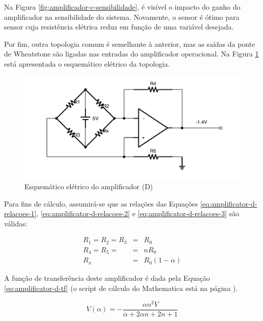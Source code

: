 \documentclass[a4paper]{instrumentacao}
\begin{document}
Na Figura \ref{fig:amplificador-c-sensibilidade}, é visível o impacto do ganho do amplificador na sensibilidade do sistema. Novamente, o sensor é ótimo para sensor cuja resistência elétrica reduz em função de uma variável desejada.


Por fim, outra topologia comum é semelhante à anterior, mas as saídas da ponte de Wheatstone são ligadas nas entradas do amplificador operacional. Na Figura \ref{fig:amplificador-d} está apresentada o esquemático elétrico da topologia.

\begin{figure}[H]
\center
\includegraphics[width=\textwidth]{Amplificador-D.pdf}
\caption{Esquemático elétrico do amplificador (D)}
\label{fig:amplificador-d}
\end{figure}

Para fins de cálculo, assumirá-se que as relações das Equações \ref{eq:amplificator-d-relacoes-1}, \ref{eq:amplificator-d-relacoes-2} e \ref{eq:amplificator-d-relacoes-3} são válidas:

\begin{eqnarray}
	R_1 = R_2 = R_3 &=& R_0 \label{eq:amplificator-d-relacoes-1} \\
	R_4 = R_5 = &=& n R_0 		\label{eq:amplificator-d-relacoes-2} \\
	R_x &=& R_0(1-\alpha) 	\label{eq:amplificator-d-relacoes-3} 
\end{eqnarray}

A função de transferência deste amplificador é dada pela Equação \ref{eq:amplificator-d-tf} (o script de cálculo do Mathematica está na página \pageref{att:amplificadores}).

\begin{equation}
	V(\alpha) = -\frac{\alpha  n^2 V}{\alpha +2 \alpha  n+2 n+1}
	\label{eq:amplificator-d-tf}
\end{equation}
\end{document}

